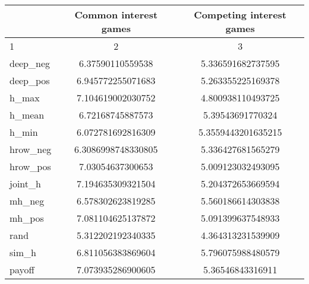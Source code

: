 \begin{tabular}{lcc}
\toprule 
 & Common interest games & Competing interest games \\
\midrule 
1 & 2 & 3 \\
\hline 
deep_neg & 6.37590110559538 & 5.336591682737595 \\
deep_pos & 6.945772255071683 & 5.263355225169378 \\
h_max & 7.104619002030752 & 4.800938110493725 \\
h_mean & 6.72168745887573 & 5.39543691770324 \\
h_min & 6.072781692816309 & 5.3559443201635215 \\
hrow_neg & 6.3086998748330805 & 5.336427681565279 \\
hrow_pos & 7.03054637300653 & 5.009123032493095 \\
joint_h & 7.194635309321504 & 5.204372653669594 \\
mh_neg & 6.578302623819285 & 5.560186614303838 \\
mh_pos & 7.081104625137872 & 5.091399637548933 \\
rand & 5.312202192340335 & 4.364313231539909 \\
sim_h & 6.811056383869604 & 5.796075988480579 \\
\hline 
payoff & 7.073935286900605 & 5.36546843316911 \\
\bottomrule 
\end{tabular}

